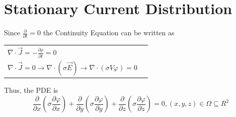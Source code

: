 \section{Stationary Current Distribution}

Since $\frac{\partial}{\partial t} = 0$ the Continuity Equation can be written as

\begin{tabular}{ll}
	\(\displaystyle \nabla \cdot \vec{J} = -\frac{\partial \rho}{\partial t} =  0\) \\
	\(\displaystyle \nabla \cdot \vec{J} = 0 \rightarrow \nabla \cdot \left(\sigma \vec{E}\right) \rightarrow \nabla \cdot \left(\sigma V \varphi\right) = 0\) \\
\end{tabular}

Thus, the PDE is
\begin{equation*}
	\frac{\partial}{\partial x}\left(\sigma \frac{\partial \varphi}{\partial x}\right) +\frac{\partial}{\partial y}\left(\sigma \frac{\partial \varphi}{\partial y}\right)
	+\frac{\partial}{\partial z}\left(\sigma \frac{\partial \varphi}{\partial z}\right) = 0, \left(x,y,z\right) \in \Omega \subseteq R^2
\end{equation*}

